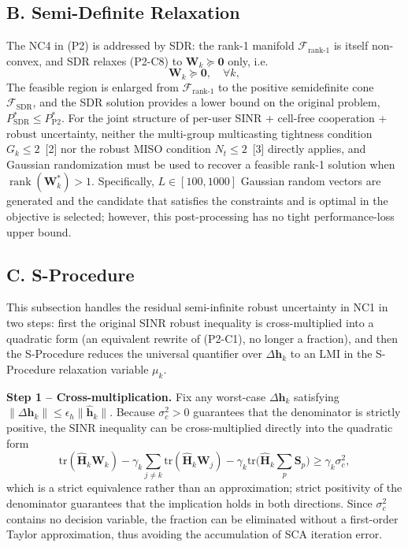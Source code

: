\documentclass[12pt,a4paper]{article}
\newcommand{\vect}[1]{\mathbf{#1}}
\newcommand{\mat}[1]{\mathbf{#1}}
\newcommand{\tr}{\text{tr}}
\DeclareMathOperator{\rank}{rank}
\begin{document}
\subsection*{B. Semi-Definite Relaxation}

The NC4 in (P2) is addressed by SDR: the rank-1 manifold $\mathcal{F}_{\text{rank-1}}$ is itself non-convex, and SDR relaxes (P2-C8) to $\mat{W}_k \succeq \mat{0}$ only, i.e.
\begin{equation}
\mat{W}_k \succeq \mat{0}, \quad \forall k, \tag{S1.1}
\end{equation}
The feasible region is enlarged from $\mathcal{F}_{\text{rank-1}}$ to the positive semidefinite cone $\mathcal{F}_{\text{SDR}}$, and the SDR solution provides a lower bound on the original problem, $P_{\text{SDR}}^* \leq P_{\text{P2}}^*$. For the joint structure of per-user SINR + cell-free cooperation + robust uncertainty, neither the multi-group multicasting tightness condition $G_k \leq 2$~[2] nor the robust MISO condition $N_t \leq 2$~[3] directly applies, and Gaussian randomization must be used to recover a feasible rank-1 solution when $\rank(\mat{W}_k^*) > 1$. Specifically, $L \in [100, 1000]$ Gaussian random vectors are generated and the candidate that satisfies the constraints and is optimal in the objective is selected; however, this post-processing has no tight performance-loss upper bound.

\subsection*{C. S-Procedure}

This subsection handles the residual semi-infinite robust uncertainty in NC1 in two steps: first the original SINR robust inequality is cross-multiplied into a quadratic form (an equivalent rewrite of (P2-C1), no longer a fraction), and then the S-Procedure reduces the universal quantifier over $\Delta\vect{h}_k$ to an LMI in the S-Procedure relaxation variable $\mu_k$.

\textbf{Step 1 -- Cross-multiplication.} Fix any worst-case $\Delta\vect{h}_k$ satisfying $\|\Delta\vect{h}_k\| \leq \epsilon_h \|\hat{\vect{h}}_k\|$. Because $\sigma_c^2 > 0$ guarantees that the denominator is strictly positive, the SINR inequality can be cross-multiplied directly into the quadratic form
\begin{equation}
\tr(\hat{\mat{H}}_k \mat{W}_k) - \gamma_k \sum_{j \neq k} \tr(\hat{\mat{H}}_k \mat{W}_j) - \gamma_k \tr\Big(\hat{\mat{H}}_k \sum_p \mat{S}_p\Big) \geq \gamma_k \sigma_c^2, \tag{S2.1}
\end{equation}
which is a strict equivalence rather than an approximation; strict positivity of the denominator guarantees that the implication holds in both directions. Since $\sigma_c^2$ contains no decision variable, the fraction can be eliminated without a first-order Taylor approximation, thus avoiding the accumulation of SCA iteration error.
\end{document}
